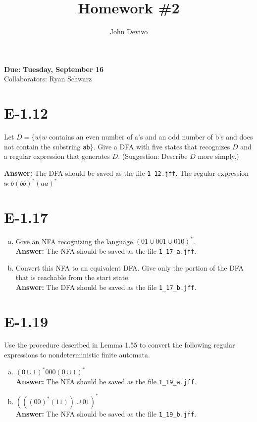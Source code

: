 \documentclass{article}
\author{John Devivo}          %
\title{Homework \#2}       %
\begin{document}
\maketitle
\begin{center}     %
\Large{\bf Due: Tuesday, September 16}\\
Collaborators: Ryan Schwarz
\end{center}       %

\section*{E-1.12}

Let $D = \{ w | w$ contains an even number of a's and an odd number of b's
and does not contain the substring {\tt ab}$\}$.
Give a DFA with five states that recognizes $D$ and a regular expression
that generates $D$. (Suggestion: Describe $D$ more simply.)

{\bf Answer: } The DFA should be saved as the file \verb=1_12.jff=.
The regular expression is  $b(bb)^*(aa)^*$

\section*{E-1.17}

\begin{enumerate}[a.]
\item Give an NFA recognizing the language $(01 \cup 001 \cup 010)^*$.\\
{\bf Answer: } The NFA should be saved as the file \verb=1_17_a.jff=.
\item Convert this NFA to an equivalent DFA.
Give only the portion of the DFA that is reachable from the start state.\\
{\bf Answer: } The DFA should be saved as the file \verb=1_17_b.jff=.
\end{enumerate}

\section*{E-1.19}

Use the procedure described in Lemma 1.55 to convert the following regular
expressions to nondeterministic finite automata.
\begin{enumerate}[a.]
\item $(0 \cup 1)^*000(0 \cup 1)^*$\\
{\bf Answer: } The NFA should be saved as the file \verb=1_19_a.jff=.
\item $(((00)^*(11)) \cup 01)^*$\\
{\bf Answer: } The NFA should be saved as the file \verb=1_19_b.jff=.
\end{enumerate}
\end{document}

